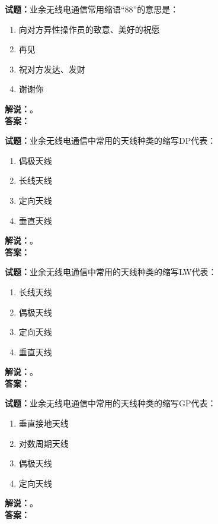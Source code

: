\documentclass{ctexbook}
\begin{document}
\vspace{\baselineskip}

\noindent\textbf{试题：}业余无线电通信常用缩语“88”的意思是：
\begin{enumerate}[leftmargin=3em]
  \item 向对方异性操作员的致意、美好的祝愿
  \item 再见
  \item 祝对方发达、发财
  \item 谢谢你
\end{enumerate}
\noindent\textbf{解说：}\textbf{}。\\\noindent\textbf{答案：}

\vspace{\baselineskip}

\noindent\textbf{试题：}业余无线电通信中常用的天线种类的缩写DP代表：
\begin{enumerate}[leftmargin=3em]
  \item 偶极天线
  \item 长线天线
  \item 定向天线
  \item 垂直天线
\end{enumerate}
\noindent\textbf{解说：}\textbf{}。\\\noindent\textbf{答案：}

\vspace{\baselineskip}

\noindent\textbf{试题：}业余无线电通信中常用的天线种类的缩写LW代表：
\begin{enumerate}[leftmargin=3em]
  \item 长线天线
  \item 偶极天线
  \item 定向天线
  \item 垂直天线
\end{enumerate}
\noindent\textbf{解说：}\textbf{}。\\\noindent\textbf{答案：}

\vspace{\baselineskip}

\noindent\textbf{试题：}业余无线电通信中常用的天线种类的缩写GP代表：
\begin{enumerate}[leftmargin=3em]
  \item 垂直接地天线
  \item 对数周期天线
  \item 偶极天线
  \item 定向天线
\end{enumerate}
\noindent\textbf{解说：}\textbf{}。\\\noindent\textbf{答案：}
\end{document}
